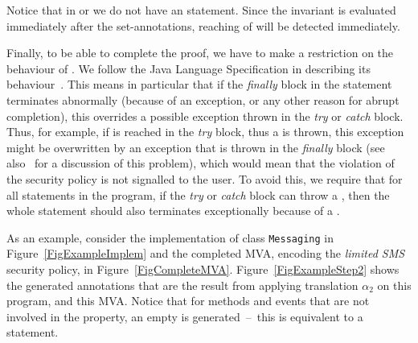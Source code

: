 Notice that in \postset or \excset we do not have an \Assert
statement. Since the invariant is evaluated immediately after the
set-annotations, reaching of \halted will be detected immediately.

Finally, to be able to complete the proof, we have to make a
restriction on the behaviour of \TryCatch. We follow the Java Language
Specification in describing its behaviour~\cite{GoslingJSB05}. This
means in particular that if the \emph{finally} block in the statement
terminates abnormally (because of an exception, or any other reason
for abrupt completion), this overrides a possible exception thrown in
the \emph{try} or \emph{catch} block. Thus, for example, if \halted
is reached in the \emph{try} block, thus a \JMLExc is thrown, this
exception might be overwritten by an exception that is thrown in the
\emph{finally} block (see also~\cite{Huisman08} for a discussion of
this problem), which would mean that the violation of the security
policy is not signalled to the user. To avoid this, we require that
for all \TryCatch statements in the program, if the \emph{try} or
\emph{catch} block can throw a \JMLExc, then the whole statement
should also terminates exceptionally because of a \JMLExc.





As an example, consider the implementation of class \texttt{Messaging}
in Figure~\ref{FigExampleImplem} and the completed MVA, encoding the
\emph{limited SMS} security policy, in
Figure~\ref{FigCompleteMVA}. Figure~\ref{FigExampleStep2} shows the
generated annotations that are the result from applying translation
\(\alpha_2\) on this program, and this MVA. Notice that for methods
and events that are not involved in the property, an empty \CaseJML is
generated~--~this is equivalent to a \Skip statement.

